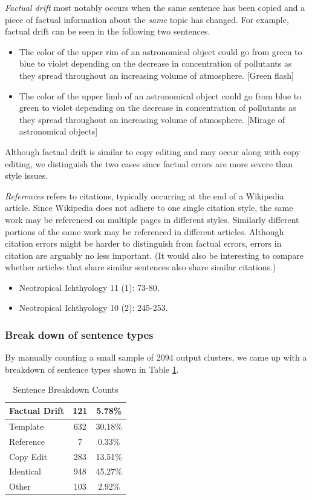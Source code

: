 \documentclass{acm_proc_article-sp}
\begin{document}
\emph{Factual drift} most notably occurs when the same sentence has been copied and a piece of factual information about the \emph{same} topic has changed. For example, factual drift can be seen in the following two sentences.
\begin{itemize}[noitemsep,nolistsep]
\item The color of the upper rim of an astronomical object could go from green to blue to violet depending on the decrease in concentration of pollutants as they spread throughout an increasing volume of atmosphere. [Green flash]
\item The color of the upper limb of an astronomical object could go from blue to green to violet depending on the decrease in concentration of pollutants as they spread throughout an increasing volume of atmosphere. [Mirage of astronomical objects]
\end{itemize}
Although factual drift is similar to copy editing and may occur along with copy editing, we distinguish the two cases since factual errors are more severe than style issues.

\emph{References} refers to citations, typically occurring at the end of a Wikipedia article. Since Wikipedia does not adhere to one single citation style, the same work may be referenced on multiple pages in different styles. Similarly different portions of the same work may be referenced in different articles. Although citation errors might be harder to distinguish from factual errors, errors in citation are arguably no less important. (It would also be interesting to compare whether articles that share similar sentences also share similar citations.) 

\begin{itemize}[noitemsep,nolistsep]
\item Neotropical Ichthyology 11 (1): 73-80.
\item Neotropical Ichthyology 10 (2): 245-253.
\end{itemize}

\subsubsection{Break down of sentence types}

By manually counting a small sample of 2094 output clusters, we came up with a breakdown of sentence types shown in Table \ref{counts}.

\begin{table}
\centering
\caption{Sentence Breakdown Counts}
\begin{tabular}{| l | c | c |}
\hline
Factual Drift & 121 & 5.78\% \\ \hline
Template & 632 & 30.18\% \\ \hline
Reference & 7 & 0.33\% \\ \hline      
Copy Edit & 283 & 13.51\% \\ \hline
Identical & 948 & 45.27\% \\ \hline
Other & 103 & 2.92\% \\ \hline
\hline
\end{tabular}
\label{counts}
\end{table}
\end{document}
